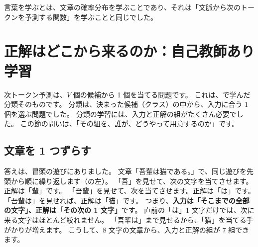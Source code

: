 言葉を学ぶとは、文章の確率分布を学ぶことであり、それは「文脈から次のトークンを予測する関数」を学ぶことと同じでした。

\section{正解はどこから来るのか：自己教師あり学習}\label{sec:lm-self-supervised}

次トークン予測は、$V$ 個の候補から 1 個を当てる問題です。
これは、で学んだ分類そのものです。
分類は、決まった候補（クラス）の中から、入力に合う 1 個を選ぶ問題でした。
分類の学習には、入力と正解の組がたくさん必要でした。
この節の問いは、「その組を、誰が、どうやって用意するのか」です。

\subsection*{文章を 1 つずらす}

答えは、冒頭の遊びにありました。
文章「吾輩は猫である。」で、同じ遊びを先頭から順に繰り返します（の左）。
「吾」を見せて、次の文字を当てさせます。正解は「輩」です。
「吾輩」を見せて、次を当てさせます。正解は「は」です。
「吾輩は」を見せれば、正解は「猫」です。
つまり、\textbf{入力は「そこまでの全部の文字」、正解は「その次の 1 文字」}です。
直前の「は」1 文字だけでは、次に来る文字はほとんど絞れません。
「吾輩は」まで見せるから、「猫」を当てる手がかりが増えます。
こうして、8 文字の文章から、入力と正解の組が 7 組できます。

